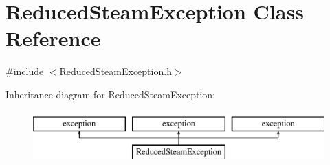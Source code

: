 \hypertarget{class_reduced_steam_exception}{}\section{Reduced\+Steam\+Exception Class Reference}
\label{class_reduced_steam_exception}


{\ttfamily \#include $<$Reduced\+Steam\+Exception.\+h$>$}

Inheritance diagram for Reduced\+Steam\+Exception\+:\begin{figure}[H]
\begin{center}
\leavevmode
\includegraphics[height=2.000000cm]{d0/dae/class_reduced_steam_exception}
\end{center}
\end{figure}
